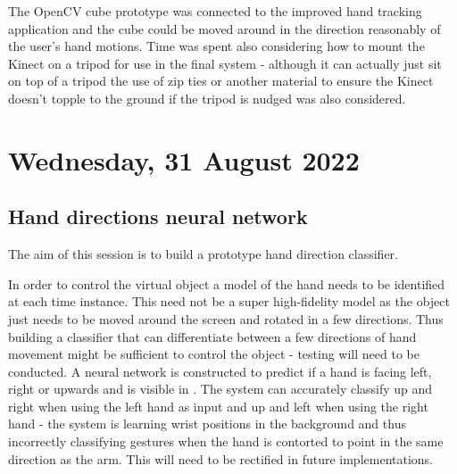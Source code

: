 The OpenCV cube prototype was connected to the improved hand tracking application and the cube could be moved around in the direction reasonably of the user's hand motions. Time was spent also considering how to mount the Kinect on a tripod for use in the final system - although it can actually just sit on top of a tripod the use of zip ties or another material to ensure the Kinect doesn't topple to the ground if the tripod is nudged was also considered.

\section[2022/08/31]{Wednesday, 31 August 2022}

\subsection{Hand directions neural network}

The aim of this session is to build a prototype hand direction classifier.


In order to control the virtual object a model of the hand needs to be identified at each time instance. This need not be a super high-fidelity model as the object just needs to be moved around the screen and rotated in a few directions. Thus building a classifier that can differentiate between a few directions of hand movement might be sufficient to control the object - testing will need to be conducted. A neural network is constructed to predict if a hand is facing left, right or upwards and is visible in . The system can accurately classify up and right when using the left hand as input and up and left when using the right hand - the system is learning wrist positions in the background and thus incorrectly classifying gestures when the hand is contorted to point in the same direction as the arm. This will need to be rectified in future implementations.

